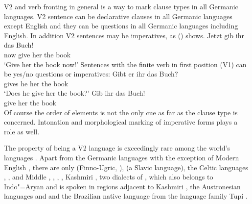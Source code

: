 V2 and verb fronting in general is a way to mark clause types in all Germanic languages. V2 sentence
can be declarative clauses in all Germanic languages except English and they can be questions in all
Germanic languages including English. In addition V2 sentences may be imperatives, as () shows.
\ea
\gll Jetzt gib ihr das Buch!\\
     now give her the book\\\german
\glt `Give her the book now!'
\z
Sentences with the finite verb in first position (V1) can be yes/no questions or imperatives:
\eal
\ex
\gll Gibt er ihr das Buch?\\
     gives he her the book\\\german
\glt `Does he give her the book?'
\ex 
\gll Gib ihr das Buch!\\
     give her the book\\
\zl
Of course the order of elements is not the only cue as far as the clause type is
concerned. Intonation and morphological marking of imperative forms plays a role as well.

The property of being a V2 language is exceedingly rare among the world's languages \citep[]{Holmberg2015a}. Apart from the Germanic languages with the exception of 
Modern English \citep{HP86a-ed}, there are only  (Finno-Ugric, \citealp[]{Holmberg2015a}),  \citep[entry~79]{Plank2003b-ed} (a Slavic language), the
Celtic languages  \citep{BK2000a-u},  \citep*[]{BTW2007a-u}, and Middle  \citep{Willis1998a-u},  \parencites[Section~1.3]{Adams1987a-u}[Section~2.1.2]{Roberts93a-u}[Chapter~2]{Vance97a-u}, 
\citep[Section~3.3.2]{Fontana97a-u}, 
 \citep{Poletto2002a-u,Anderson2006a-u}, Kashmiri
\citep[Chapter~4]{Bhatt99a-u}, two dialects of , which also belongs to Indo"=Aryan
and is spoken in regions adjacent to Kashmiri \citep{Hendriksen90a}, the Austronesian
languages  and  \citep[]{Ross2004a-u} and the Brazilian native
language  from the language family Tupí \citep{Storto2003a-u}.



